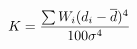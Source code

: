 \documentclass[10pt]{article}
\begin{document}
\begin{align*}K = {\sum W_i(d_i-\overline d)^4\over 100\sigma^4}\end{align*}
\end{document}
